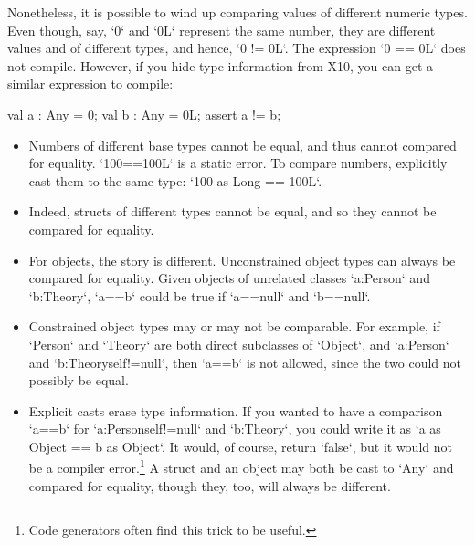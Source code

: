 \begin{ex}
Nonetheless, it is possible to wind up comparing values of different numeric
types.   Even though, say, \xcd`0` and \xcd`0L` represent the same number,
they are different values and of different types, and hence, \xcd`0 != 0L`.  
The expression \xcd`0 == 0L` does not compile.  However, if you hide type
information from X10, you can get a similar expression to compile: 

\begin{xten}
   val a : Any = 0;
   val b : Any = 0L;
   assert a != b;
\end{xten}


\end{ex}


\begin{itemize}

\item Numbers of different base types cannot be equal, and thus cannot compared for equality.  
\xcd`100==100L` is a static error.  To compare numbers, explicitly cast them
to the same type: \xcd`100 as Long == 100L`.

\item Indeed, structs of different types cannot be equal, and so they cannot be
compared for equality.  

\item For objects, the story is different. Unconstrained object types can
      always be compared for equality. Given objects of unrelated classes
      \xcd`a:Person` and 
      \xcd`b:Theory`, \xcd`a==b` could be true if \xcd`a==null` and
      \xcd`b==null`. 

\item Constrained object types may or may not be comparable.  For example,  
      if \xcd`Person` and \xcd`Theory` are both direct subclasses of
      \xcd`Object`, and \xcd`a:Person` and \xcd`b:Theory{self!=null}`, then
      \xcd`a==b` is not allowed, since the two could not possibly be equal.

\item Explicit casts erase type information.  If you wanted
      to have a comparison \xcd`a==b` for \xcd`a:Person{self!=null}` and
      \xcd`b:Theory`, you could write it as \xcd`a as Object == b as Object`.
      It would, of course, return \xcd`false`, but it would not be a compiler
      error.\footnote{Code generators often find this trick to be useful.}
      A struct and an object may both be cast to \xcd`Any` and compared for
      equality, though they, too, will always be different.

\end{itemize}





